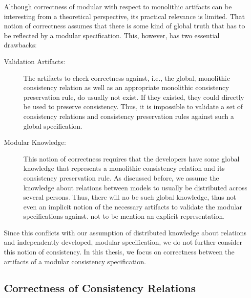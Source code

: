 Although correctness of modular with respect to monolithic artifacts can be interesting from a theoretical perspective, its practical relevance is limited.
That notion of correctness assumes that there is some kind of global truth that has to be reflected by a modular specification.
This, however, has two essential drawbacks:
\begin{description}
    \item[Validation Artifacts:] The artifacts to check correctness against, i.e., the global, monolithic \gls{consistency relation} as well as an appropriate monolithic \gls{consistency preservation rule}, do usually not exist. If they existed, they could directly be used to preserve consistency. Thus, it is impossible to validate a set of \glspl{consistency relation} and \glspl{consistency preservation rule} against such a global specification.
    \item[Modular Knowledge:] This notion of correctness requires that the developers have some global knowledge that represents a monolithic \gls{consistency relation} and its \gls{consistency preservation rule}. As discussed before, we assume  the knowledge about relations between models to usually be distributed across several persons. Thus, there will no be such global knowledge, thus not even an implicit notion of the necessary artifacts to validate the modular specifications against. not to be mention an explicit representation.
\end{description}
%
Since this conflicts with our assumption of distributed knowledge about relations and independently developed, modular specification, we do not further consider this notion of consistency.
In this thesis, we focus on correctness between the artifacts of a modular consistency specification.


\subsection{Correctness of Consistency Relations}

